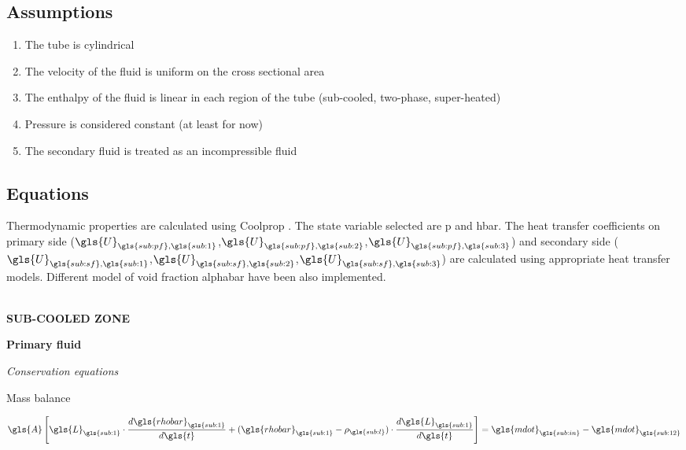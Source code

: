 \documentclass[11pt]{article} %
\begin{document}
\subsection{Assumptions}
\begin{enumerate}
\renewcommand{\theenumi}{\roman{enumi}}
\item The tube is cylindrical
\item The velocity of the fluid is uniform on the cross sectional area
\item The enthalpy of the fluid is linear in each region of the tube (sub-cooled, two-phase, super-heated)
\item Pressure is considered constant (at least for now)
\item The secondary fluid is treated as an incompressible fluid
\end{enumerate}
\subsection{Equations}
Thermodynamic properties are calculated using Coolprop \cite{Bell2013}. The state variable selected are \gls{p} and \gls{hbar}. The heat transfer coefficients on primary side ($\gls{U}_{\gls{sub:pf},\gls{sub:1}}$,$\gls{U}_{\gls{sub:pf},\gls{sub:2}}$,$\gls{U}_{\gls{sub:pf},\gls{sub:3}}$) and secondary side ($\gls{U}_{\gls{sub:sf},\gls{sub:1}}$,$\gls{U}_{\gls{sub:sf},\gls{sub:2}}$,$\gls{U}_{\gls{sub:sf},\gls{sub:3}}$) are calculated using appropriate heat transfer models. Different model of void fraction \gls{alphabar} have been also implemented.\\
\\
\begin{center}
{\bf SUB-COOLED ZONE}
\end{center}
{\bf Primary fluid} 
\begin{center}
\textit{Conservation equations}\\
\end{center}


\begin{flushleft}
Mass balance\\
\end{flushleft}
\begin{equation}
\gls{A} \left[\gls{L}_{\gls{sub:1}}  \cdot \frac{d \gls{rhobar}_{\gls{sub:1}}}{d \gls{t}} + (\gls{rhobar}_{\gls{sub:1}} - \rho_{\gls{sub:l}}) \cdot \frac{d \gls{L}_{\gls{sub:1}}}{d \gls{t}}\right] = \gls{mdot}_{\gls{sub:in}} -  \gls{mdot}_{\gls{sub:12}}
\end{equation}
\end{document}
